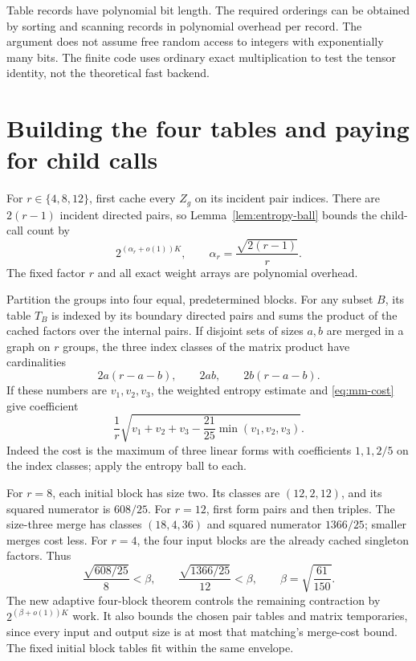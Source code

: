 \documentclass[11pt,letterpaper]{article}
\theoremstyle{remark}\newtheorem{remark}[theorem]{Remark}
\begin{document}
Table records have polynomial bit length. The required orderings can be
obtained by sorting and scanning records in polynomial overhead per record.
The argument does not assume free random access to integers with
exponentially many bits. The finite code uses ordinary exact multiplication
to test the tensor identity, not the theoretical fast backend.



\section{Building the four tables and paying for child calls}
\label{sec:local}

For $r\in\{4,8,12\}$, first cache every $Z_g$ on its incident pair
indices. There are $2(r-1)$ incident directed pairs, so
Lemma~\ref{lem:entropy-ball} bounds the child-call count by
\[
 2^{(\alpha_r+o(1))K},\qquad
 \alpha_r=\frac{\sqrt{2(r-1)}}r.
\]
The fixed factor $r$ and all exact weight arrays are polynomial overhead.

Partition the groups into four equal, predetermined blocks. For any subset
$B$, its table $T_B$ is indexed by its boundary directed pairs and sums
the product of the cached factors over the internal pairs. If disjoint
sets of sizes $a,b$ are merged in a graph on $r$ groups, the three index
classes of the matrix product have cardinalities
\[
 2a(r-a-b),\qquad 2ab,\qquad 2b(r-a-b).
\]
If these numbers are $v_1,v_2,v_3$, the weighted entropy estimate and
\eqref{eq:mm-cost} give coefficient
\begin{equation}\label{eq:merge-cardinality}
 \frac1r\sqrt{v_1+v_2+v_3-\frac{21}{25}\min(v_1,v_2,v_3)}.
\end{equation}
Indeed the cost is the maximum of three linear forms with coefficients
$1,1,2/5$ on the index classes; apply the entropy ball to each.

For $r=8$, each initial block has size two. Its classes are $(12,2,12)$,
and its squared numerator is $608/25$. For $r=12$, first form pairs and
then triples. The size-three merge has classes $(18,4,36)$ and squared
numerator $1366/25$; smaller merges cost less. For $r=4$, the four input
blocks are the already cached singleton factors. Thus
\[
 \frac{\sqrt{608/25}}8 < \beta,
 \qquad \frac{\sqrt{1366/25}}{12}<\beta,
 \qquad \beta=\sqrt{\frac{61}{150}}.
\]
The new adaptive four-block theorem controls the remaining contraction
by $2^{(\beta+o(1))K}$ work. It also bounds the chosen pair tables and
matrix temporaries, since every input and output size is at most that
matching's merge-cost bound. The fixed initial block tables fit within
the same envelope.
\end{document}
